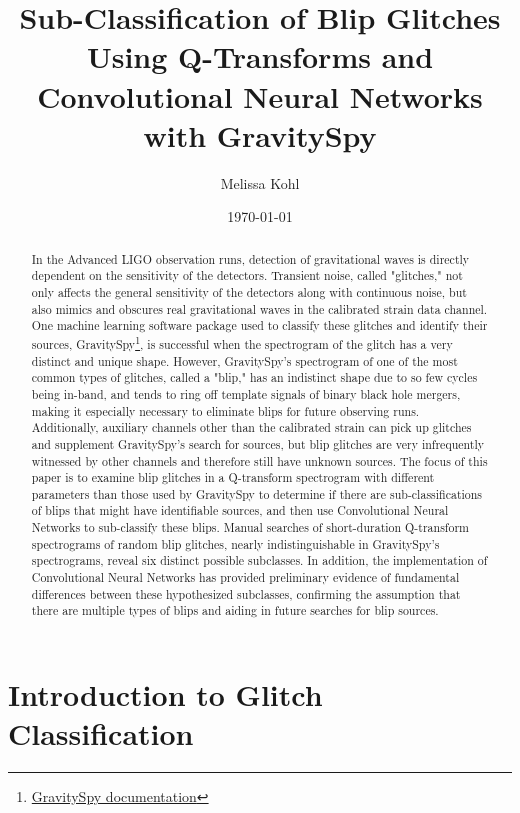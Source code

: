 \documentclass[a4paper]{article}
\title{Sub-Classification of Blip Glitches Using Q-Transforms and Convolutional Neural Networks with GravitySpy}
\author{Melissa Kohl}
\date{\today}
\begin{document}
\maketitle
\graphicspath{ {images/} }

\begin{abstract}

In the Advanced LIGO observation runs, detection of gravitational waves is directly dependent on the sensitivity of the detectors. Transient noise, called "glitches," not only affects the general sensitivity of the detectors along with continuous noise, but also mimics and obscures real gravitational waves in the calibrated strain data channel. One machine learning software package used to classify these glitches and identify their sources, GravitySpy\footnote{\href{https://gravity-spy.github.io}{GravitySpy documentation}}, is successful when the spectrogram of the glitch has a very distinct and unique shape. However, GravitySpy's spectrogram of one of the most common types of glitches, called a "blip," has an indistinct shape due to so few cycles being in-band, and tends to ring off template signals of binary black hole mergers, making it especially necessary to eliminate blips for future observing runs. Additionally, auxiliary channels other than the calibrated strain can pick up glitches and supplement GravitySpy's search for sources, but blip glitches are very infrequently witnessed by other channels and therefore still have unknown sources. The focus of this paper is to examine blip glitches in a Q-transform spectrogram with different parameters than those used by GravitySpy to determine if there are sub-classifications of blips that might have identifiable sources, and then use Convolutional Neural Networks to sub-classify these blips. Manual searches of short-duration Q-transform spectrograms of random blip glitches, nearly indistinguishable in GravitySpy's spectrograms, reveal six distinct possible subclasses. In addition, the implementation of Convolutional Neural Networks has provided preliminary evidence of fundamental differences between these hypothesized subclasses, confirming the assumption that there are multiple types of blips and aiding in future searches for blip sources.

\end{abstract} 

\section{Introduction to Glitch Classification} \label{introduction}
\end{document}
